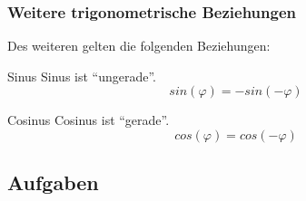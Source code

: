 \subsubsection{Weitere trigonometrische Beziehungen}
Des weiteren gelten die folgenden Beziehungen:
\begin{gesetz}{Sinus}{}
  Sinus ist ``ungerade''.
  $$sin(\varphi) = - sin(-\varphi)$$
  \end{gesetz}

\begin{gesetz}{Cosinus}{}
  Cosinus ist ``gerade''.
  $$cos(\varphi) = cos(-\varphi)$$
  \end{gesetz}

\newpage

\subsection*{Aufgaben}
